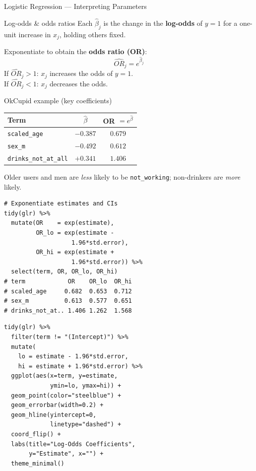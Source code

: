 \documentclass[11pt, aspectratio=169]{beamer}
\begin{document}
\begin{frame}{Logistic Regression --- Interpreting Parameters}
	\begin{block}{Log-odds \& odds ratios}
				Each $\hat\beta_j$ is the change in the \textbf{log-odds} of
				$y=1$ for a one-unit increase in $x_j$, holding others fixed.
				\medskip

				Exponentiate to obtain the \textbf{odds ratio (OR)}:
				\[
				\widehat{OR}_j = e^{\hat\beta_j}
				\]
				If $\widehat{OR}_j > 1$: $x_j$ increases the odds of $y=1$.\\
				If $\widehat{OR}_j < 1$: $x_j$ decreases the odds.
			\end{block}
			\begin{block}{OkCupid example (key coefficients)}
				\footnotesize
				\begin{tabular}{lcc}
					\toprule
					\textbf{Term} & $\hat\beta$ & OR $= e^{\hat\beta}$\\
					\midrule
					\texttt{scaled\_age}   & $-0.387$ & $0.679$\\
					\texttt{sex\_m}        & $-0.492$ & $0.612$\\
					\texttt{drinks\_not\_at\_all} & $+0.341$ & $1.406$\\
					\bottomrule
				\end{tabular}
				\medskip

				Older users and men are \emph{less} likely to be \texttt{not\_working};
				non-drinkers are \emph{more} likely.
			\end{block}
		\begin{lstlisting}[title={Odds ratios \& CIs}]
# Exponentiate estimates and CIs
tidy(glr) %>%
  mutate(OR    = exp(estimate),
         OR_lo = exp(estimate -
                   1.96*std.error),
         OR_hi = exp(estimate +
                   1.96*std.error)) %>%
  select(term, OR, OR_lo, OR_hi)
# term            OR    OR_lo  OR_hi
# scaled_age     0.682  0.653  0.712
# sex_m          0.613  0.577  0.651
# drinks_not_at.. 1.406 1.262  1.568
			\end{lstlisting}
			\begin{lstlisting}[title={Coefficient plot}]
tidy(glr) %>%
  filter(term != "(Intercept)") %>%
  mutate(
    lo = estimate - 1.96*std.error,
    hi = estimate + 1.96*std.error) %>%
  ggplot(aes(x=term, y=estimate,
             ymin=lo, ymax=hi)) +
  geom_point(color="steelblue") +
  geom_errorbar(width=0.2) +
  geom_hline(yintercept=0,
             linetype="dashed") +
  coord_flip() +
  labs(title="Log-Odds Coefficients",
       y="Estimate", x="") +
  theme_minimal()
			\end{lstlisting}
		\end{frame}
\end{document}

